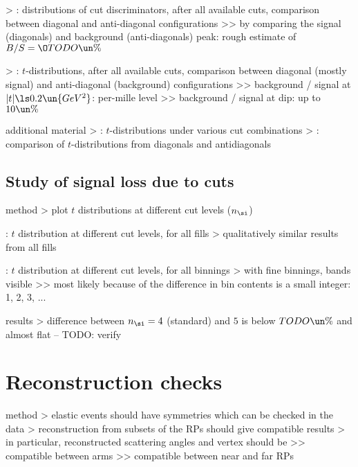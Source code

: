 \>> : distributions of cut discriminators, after all available cuts, comparison between diagonal and anti-diagonal configurations
\>>> by comparing the signal (diagonals) and background (anti-diagonals) peak: rough estimate of $B/S = \O{TODO\un{\%}}$

\>> : $t$-distributions, after all available cuts, comparison between diagonal (mostly signal) and anti-diagonal (background) configurations
\>>> background / signal at $|t| \ls 0.2\un{GeV^2}$: per-mille level
\>>> background / signal at dip: up to $10\un{\%}$


\> additional material
\>> : $t$-distributions under various cut combinations
\>> : comparison of $t$-distributions from diagonals and antidiagonals



\section{Study of signal loss due to cuts}

\> method
\>> plot $t$ distributions at different cut levels ($n_\si$)

\> : $t$ distribution at different cut levels, for all fills
\>> qualitatively similar results from all fills

\> : $t$ distribution at different cut levels, for all binnings
\>> with fine binnings, bands visible
\>>> most likely because of the difference in bin contents is a small integer: 1, 2, 3, ...

\> results
\>> difference between $n_\si = 4$ (standard) and $5$ is below $TODO\un{\%}$ and almost flat -- TODO: verify



\chapter[reco-checks]{Reconstruction checks}

\> method
\>> elastic events should have symmetries which can be checked in the data
\>> reconstruction from subsets of the RPs should give compatible results
\>> in particular, reconstructed scattering angles and vertex should be
\>>> compatible between arms
\>>> compatible between near and far RPs

